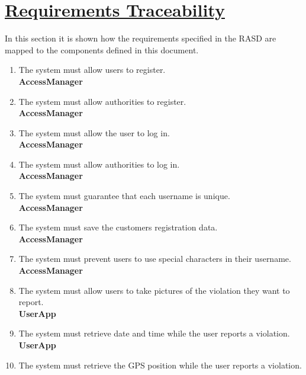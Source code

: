 \section[Requirements Traceability]{\hyperlink{toc}{Requirements Traceability}}
	\label{sec:requirementsTraceability}
	
	In this section it is shown how the requirements specified in the RASD are mapped
	to the components defined in this document.
	
	\begin{enumerate}[label=\textbf{R\arabic*}]
		\item \label{req:userReg} The system must allow users to register.\\
		\textbf{AccessManager}
		\item \label{req:authorityReg} The system must allow authorities to register.\\
		\textbf{AccessManager}
		\item \label{req:userLogin} The system must allow the user to log in.\\
		\textbf{AccessManager}
		\item \label{req:authorityLogin} The system must allow authorities to log in.\\
		\textbf{AccessManager}
		\item \label{req:uniqueName} The system must guarantee that each username is unique.\\
		\textbf{AccessManager}
		\item \label{req:saveRegData} The system must save the customers registration data.\\
		\textbf{AccessManager}
		\item \label{req:specialCharacters} The system must prevent users to use special characters in their username.\\
		\textbf{AccessManager}
		\item \label{req:takePictures} The system must allow users to take pictures of the violation they want to report.\\
		\textbf{UserApp}
		\item \label{req:dateTime} The system must retrieve date and time while the user reports a violation.\\
		\textbf{UserApp}
		\item \label{req:gpsPosition} The system must retrieve the GPS position while the user reports a violation.\\

\end{enumerate}
